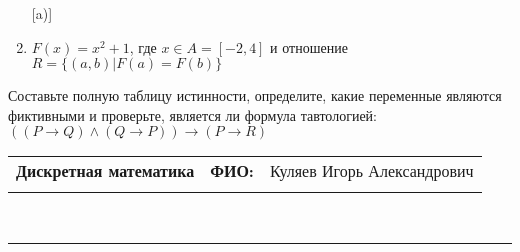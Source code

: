 \documentclass[10pt]{exam}
\newcommand{\class}{Дискретная математика}
\newcommand{\examdate}{}
\begin{document}
\begin{questions}
\begin{enumerate} [a)]
\item $F(x)=x^{2}+1$, где $x \in A = [-2, 4]$ и отношение $R = \{(a,b)|F(a) = F(b)\}$
\end{enumerate}\question Составьте полную таблицу истинности, определите, какие переменные являются фиктивными и проверьте, является ли формула тавтологией:
$(( P \rightarrow Q) \land (Q \rightarrow P)) \rightarrow (P \rightarrow R)$

\end{questions}
\newpage
\begin{flushright}
\begin{tabular}{p{2.8in} r l}
\textbf{\class} & \textbf{ФИО:} &Куляев Игорь Александрович
\\

\textbf{\examdate} &&\\
\end{tabular}\\
\end{flushright}
\rule[1ex]{\textwidth}{.1pt}
\end{document}
